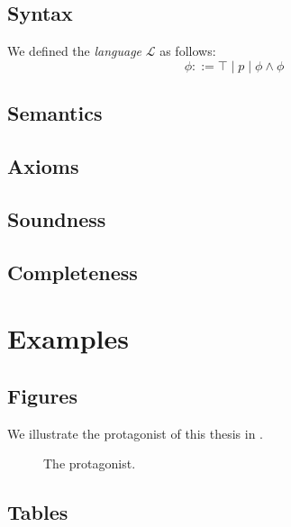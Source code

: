 \documentclass[titlepage,a4paper]{report}
\begin{document}
\lipsum[15]

\section{Syntax}

\begin{definition}\label{def:lang}
We defined the \emph{language} $\mathcal{L}$ as follows:
  \[
    \phi ::= \top \mid p \mid \phi \land \phi
  \]
\end{definition}

\lipsum[21]

\section{Semantics}

\section{Axioms}

\section{Soundness}

\section{Completeness}

\chapter{Examples}

\section{Figures}

We illustrate the protagonist of this thesis in .

\begin{figure}[H]
  \centering
  \caption{The protagonist.}\label{fig:drawing}
\end{figure}

\section{Tables}
\end{document}
